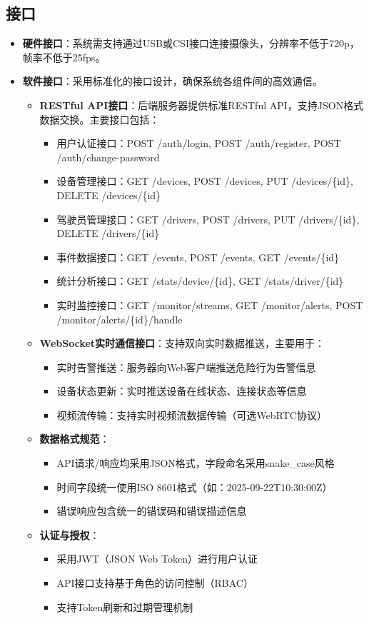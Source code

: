 \documentclass[a4paper,12pt]{article}
\begin{document}
\subsection{接口}
\begin{itemize}
    \item \textbf{硬件接口}：系统需支持通过USB或CSI接口连接摄像头，分辨率不低于720p，帧率不低于25fps。
    \item \textbf{软件接口}：采用标准化的接口设计，确保系统各组件间的高效通信。
    \begin{itemize}
        \item \textbf{RESTful API接口}：后端服务器提供标准RESTful API，支持JSON格式数据交换。主要接口包括：
        \begin{itemize}
            \item 用户认证接口：POST /auth/login, POST /auth/register, POST /auth/change-password
            \item 设备管理接口：GET /devices, POST /devices, PUT /devices/\{id\}, DELETE /devices/\{id\}
            \item 驾驶员管理接口：GET /drivers, POST /drivers, PUT /drivers/\{id\}, DELETE /drivers/\{id\}
            \item 事件数据接口：GET /events, POST /events, GET /events/\{id\}
            \item 统计分析接口：GET /stats/device/\{id\}, GET /stats/driver/\{id\}
            \item 实时监控接口：GET /monitor/streams, GET /monitor/alerts, POST /monitor/alerts/\{id\}/handle
        \end{itemize}
        \item \textbf{WebSocket实时通信接口}：支持双向实时数据推送，主要用于：
        \begin{itemize}
            \item 实时告警推送：服务器向Web客户端推送危险行为告警信息
            \item 设备状态更新：实时推送设备在线状态、连接状态等信息
            \item 视频流传输：支持实时视频流数据传输（可选WebRTC协议）
        \end{itemize}
        \item \textbf{数据格式规范}：
        \begin{itemize}
            \item API请求/响应均采用JSON格式，字段命名采用snake\_case风格
            \item 时间字段统一使用ISO 8601格式（如：2025-09-22T10:30:00Z）
            \item 错误响应包含统一的错误码和错误描述信息
        \end{itemize}
        \item \textbf{认证与授权}：
        \begin{itemize}
            \item 采用JWT（JSON Web Token）进行用户认证
            \item API接口支持基于角色的访问控制（RBAC）
            \item 支持Token刷新和过期管理机制
        \end{itemize}
    \end{itemize}
\end{itemize}
\end{document}
